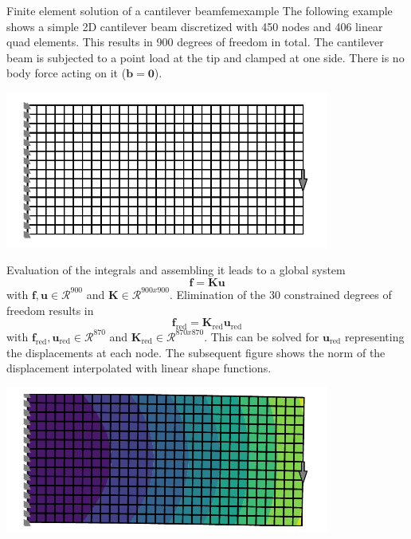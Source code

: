 \begin{example}{Finite element solution of a cantilever beam}{femexample} 
    The following example shows a simple 2D cantilever beam discretized with 450 nodes and 406 linear quad elements. This results in 900 degrees of freedom in total. The cantilever beam is subjected to a point load at the tip and clamped at one side. There is no body force acting on it ($\mathbf{b} = \mathbf{0}$).
    \begin{center}
        \includegraphics[width=0.8\textwidth]{figures/cantilever_fem.pdf}
    \end{center}
    Evaluation of the integrals and assembling it leads to a global system 
    \begin{equation}
        \mathbf{f} = \mathbf{K} \mathbf{u}
    \end{equation}
    with $\mathbf{f}, \mathbf{u} \in \mathcal{R}^{900}$ and $\mathbf{K} \in \mathcal{R}^{900x900}$. Elimination of the 30 constrained degrees of freedom results in 
    \begin{equation}
        \mathbf{f}_\textrm{red} = \mathbf{K}_\textrm{red} \mathbf{u}_\textrm{red}
    \end{equation}
    with $\mathbf{f}_\textrm{red}, \mathbf{u}_\textrm{red} \in \mathcal{R}^{870}$ and $\mathbf{K}_\textrm{red} \in \mathcal{R}^{870x870}$. This can be solved for $\mathbf{u}_\textrm{red}$ representing the displacements at each node. The subsequent figure shows the norm of the displacement interpolated with linear shape functions.
    \begin{center}
        \includegraphics[width=0.8\textwidth]{figures/cantilever_fem_solved.pdf}
    \end{center}
\end{example}


 



